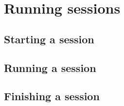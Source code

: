 \chapter{Running sessions}
\label{ch:RunningSessions}

\section{Starting a session}


\section{Running a session}


\section{Finishing a session}